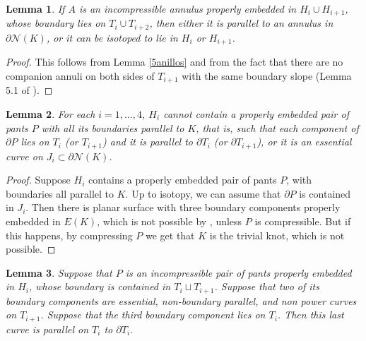 \documentclass[12pt]{amsart}
\newtheorem{lema}{Lemma}
\begin{document}
\begin{lema}\label{noanillosconsecutivos}
If $A$ is an incompressible annulus properly embedded in $H_i\cup H_{i+1}$, whose boundary lies on $T_i\cup T_{i+2}$, then either it is parallel to an annulus in $\partial \mathcal{N}(K)$, or it can be isotoped to lie in $H_i$ or $H_{i+1}$. \end{lema}

\begin{proof} This follows from Lemma \ref{5anillos} and from the fact that there are no companion annuli on both sides of $T_{i+1}$ with the same boundary slope (Lemma 5.1 of \cite{Tejano}). \end{proof}

\begin{lema}\label{3pK}
For each $i=1,\ldots, 4$, $H_i$ cannot contain a properly embedded pair of pants $P$ with all its boundaries parallel to $K$, that is, such that each component of $\partial{P}$ lies on $T_i$ (or $T_{i+1}$) and it is parallel to $\partial T_i$ (or $\partial T_{i+1}$), or it is an essential curve on $J_i \subset \partial \mathcal{N}(K)$.
\end{lema}
\begin{proof}
Suppose $H_i$ contains a properly embedded pair of pants $P$, with boundaries all parallel to $K$. Up to isotopy, we can assume that  $\partial P$ is contained in $J_i$. Then there is planar surface with three boundary components properly embedded in $E(K)$, which is not possible by \cite{Gabai}, unless $P$ is compressible. But if this happens, by compressing $P$ we get that $K$ is the trivial knot, which is not possible.
\end{proof}

\begin{lema}\label{pants}
Suppose that $P$ is an incompressible pair of pants properly embedded in $H_i$, whose boundary is contained in $T_i \sqcup T_{i+1}$. Suppose that two of its boundary components are essential, non-boundary parallel, and non power curves on $T_{i+1}$. Suppose that the third boundary component lies on $T_i$. Then this last curve is parallel on $T_i$ to $\partial T_i$.
\end{lema}
\end{document}
